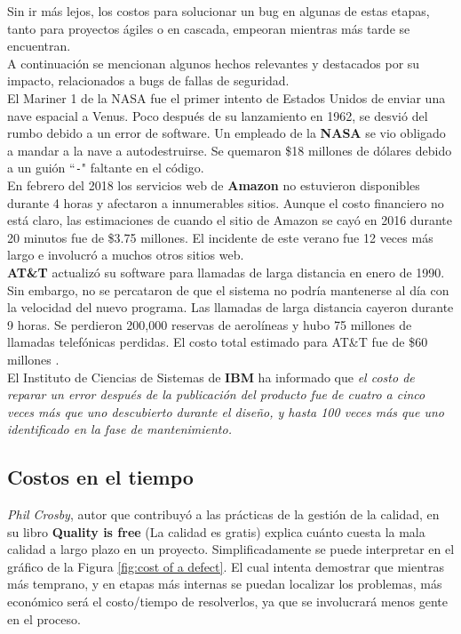 Sin ir más lejos, los costos para solucionar un bug en algunas de estas etapas, tanto para proyectos ágiles o en cascada, empeoran mientras más tarde se encuentran.\\

A continuación se mencionan algunos hechos relevantes y destacados por su impacto, relacionados a bugs de fallas de seguridad. \\

El Mariner 1 de la NASA fue el primer intento de Estados Unidos de enviar una nave espacial a Venus. Poco después de su lanzamiento en 1962, se desvió del rumbo debido a un error de software. Un empleado de la \textbf{NASA} se vio obligado a mandar a la nave a autodestruirse. Se quemaron \$18 millones de dólares debido a un guión ``\texttt{-}" faltante en el código\cite{TrueCostSoftBugCelerity}.\\

En febrero del 2018 los servicios web de \textbf{Amazon} no estuvieron disponibles durante 4 horas y afectaron a innumerables sitios. Aunque el costo financiero no está claro, las estimaciones de cuando el sitio de Amazon se cayó en 2016 durante 20 minutos fue de \$3.75 millones. El incidente de este verano fue 12 veces más largo e involucró a muchos otros sitios web.\\

\textbf{AT\&T} actualizó su software para llamadas de larga distancia en enero de 1990. Sin embargo, no se percataron de que el sistema no podría mantenerse al día con la velocidad del nuevo programa. Las llamadas de larga distancia cayeron durante 9 horas. Se perdieron 200,000 reservas de aerolíneas y hubo 75 millones de llamadas telefónicas perdidas. El costo total estimado para AT\&T fue de \$60 millones \cite{TrueCostSoftBugCBT}.\\

El Instituto de Ciencias de Sistemas de \textbf{IBM} ha informado que \textit{el costo de reparar un error después de la publicación del producto fue de cuatro a cinco veces más que uno descubierto durante el diseño, y hasta 100 veces más que uno identificado en la fase de mantenimiento.}


\subsection{Costos en el tiempo}
\textit{Phil Crosby}, autor que contribuyó a las prácticas de la gestión de la calidad, en su libro \textbf{Quality is free} (La calidad es gratis) explica cuánto cuesta la mala calidad a largo plazo en un proyecto. Simplificadamente se puede interpretar en el gráfico de la Figura \ref{fig:cost of a defect}. El cual intenta demostrar que mientras más temprano, y en etapas más internas se puedan localizar los problemas, más económico será el costo/tiempo de resolverlos, ya que se involucrará menos gente en el proceso.\\

